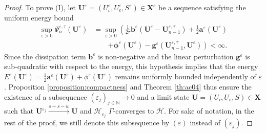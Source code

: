 \documentclass[a4paper,11pt]{article}
\theoremstyle{definition}
\numberwithin{equation}{section}
\newcommand{\e}{\varepsilon}
\begin{document}
\begin{proof} 
	To prove (I), let $\mathbf{U}^\e=(U_i^\e,U_e^\e,S^\e)\in \mathbf{X}^\e$ be a sequence satisfying the uniform energy bound 
	\begin{align*}
		\sup_{\e>0} \Psi_n^{\e,\tau}(\mathbf{U}^\e) 
		&= \sup_{\e>0} \left(\frac{1}{2\tau} \mathbf{b}^\e(\mathbf{U}^\e - \mathbf{U}_{n-1}^{\e,\tau}) 
		+ \frac{1}{2} \mathbf{a}^\e(\mathbf{U}^\e)\right.\\
		&\qquad \left.+ \mathbf{\phi}^\e(\mathbf{U}^\e) 
		- \mathbf{g}^\e(\mathbf{U}_{n-1}^{\e,\tau}, \mathbf{U}^\e)\right) < \infty.
	\end{align*}	 
	Since the dissipation term $\mathbf{b}^\e$ is non-negative and the linear perturbation $\mathbf{g}^\e$ is sub-quadratic with respect to the energy, this hypothesis implies that the energy $E^\e(\mathbf{U}^\e)= \frac{1}{2} \mathbf{a}^\e(\mathbf{U}^\e) + \phi^\e(\mathbf{U}^\e)$ remains uniformly bounded independently of $\e$.  Proposition \ref{proposition:compactness} and Theorem \ref{th:ac04} thus ensure the existence of a subsequence $(\e_j)_{j\in \mathbb{N}} \to 0$ and a limit state $\mathbf{U} = (U_{i}, U_{e}, S) \in \mathbf{X}$ such that $\mathbf{U}^{\e_j} \xrightarrow{s-s-w} \mathbf{U}$ and $\mathcal H_{\e_j}$ $\Gamma$-converges to $\mathcal H$. For sake of notation, in the rest of the proof, we still denote this subsequence by $(\e)$ instead of $(\e_j)$.
	

\end{proof}
\end{document}
